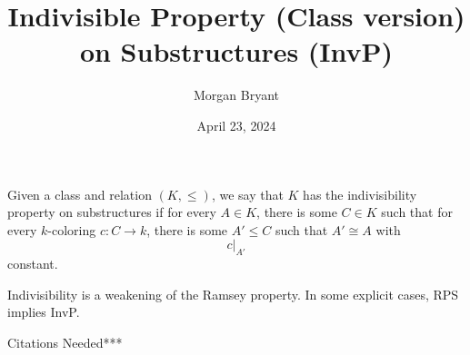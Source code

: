 \documentclass[a4paper]{article}
\title{Indivisible Property (Class version) on Substructures (InvP)}
\date{April 23, 2024}
\author{Morgan Bryant}
\begin{document}
\maketitle
\par{Given a class and relation \((K, \leq )\), we say that \(K\) has the indivisibility property on substructures if for every \(A  \in  K\), there is some \(C \in  K\)
such that for every \(k\)-coloring \(c: C \rightarrow  k\), there is some \(A' \leq  C\) such that \(A'  \cong  A\) with \[c|_{A'}\] constant.}\par{Indivisibility is a weakening of the Ramsey property. In some explicit cases, RPS implies InvP.}\par{Citations Needed***}
\printbibliography
\end{document}

